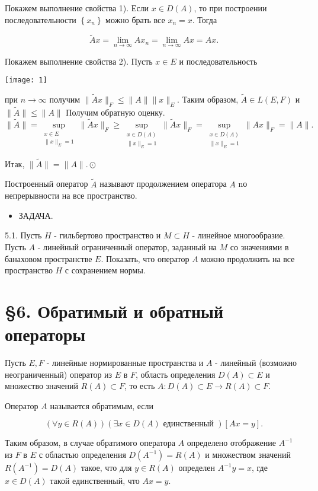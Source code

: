 Покажем выполнение свойства 1). Если $x \in D(A)$, то при построении последовательности $\left\{x_{n}\right\}$ можно брать все $x_{n}=x$. Тогда

$$
\widetilde{A} x=\lim _{n \rightarrow \infty} A x_{n}=\lim _{n \rightarrow \infty} A x=A x .
$$

Покажем выполнение свойства 2). Пусть $x \in E$ и последовательность

\texttt{[image: 1]}

при $n \rightarrow \infty$ получим $\|\widetilde{A} x\|_{F} \leq\|A\|\|x\|_{E}$. Таким образом, $\widetilde{A} \in L(E, F)$ и $\|\widetilde{A}\| \leq\|A\|$ Получим обратную оценку.
$$\|\widetilde{A}\|=\sup _{\substack{x \in E \\\|x\|_{E}=1}}\|\widetilde{A} x\|_{F} \geq \sup _{\substack{x \in D(A) \\\|x\|_{E}=1}}\|\widetilde{A} x\|_{F}=\sup _{\substack{x \in D(A) \\\|x\|_{E}=1}}\|A x\|_{F}=\|A\|.$$

Итак, $\|\widetilde{A}\|=\|A\| . \odot$

Построенный оператор $\widetilde{A}$ называют продолжением оператора $A$ nо непрерывности на все пространство.

\begin{itemize}
  \item ЗАДАЧА.
\end{itemize}

5.1. Пусть $H$ - гильбертово пространство и $M \subset H$ - линейное многообразие. Пусть $A$ - линейный ограниченный оператор, заданный на $M$ со значениями в банаховом пространстве $E$. Показать, что оператор $A$ можно продолжить на все пространство $H$ с сохранением нормы.

\section*{§6. Обратимый и обратный операторы}
Пусть $E, F$ - линейные нормированные пространства и $A$ - линейный (возможно неограниченный) оператор из $E$ в $F$, область определения $D(A) \subset E$ и множество значений $R(A) \subset F$, то есть $A: D(A) \subset E \rightarrow R(A) \subset F$.

Оператор $A$ называется обратимым, если

$$
(\forall y \in R(A))(\exists x \in D(A) \text { единственный })[A x=y] .
$$

Таким образом, в случае обратимого оператора $A$ определено отображение $A^{-1}$ из $F$ в $E$ с областью определения $D\left(A^{-1}\right)=R(A)$ и множеством значений $R\left(A^{-1}\right)=D(A)$ такое, что для $y \in R(A)$ определен $A^{-1} y=x$, где $x \in D(A)$ такой единственный, что $A x=y$.

